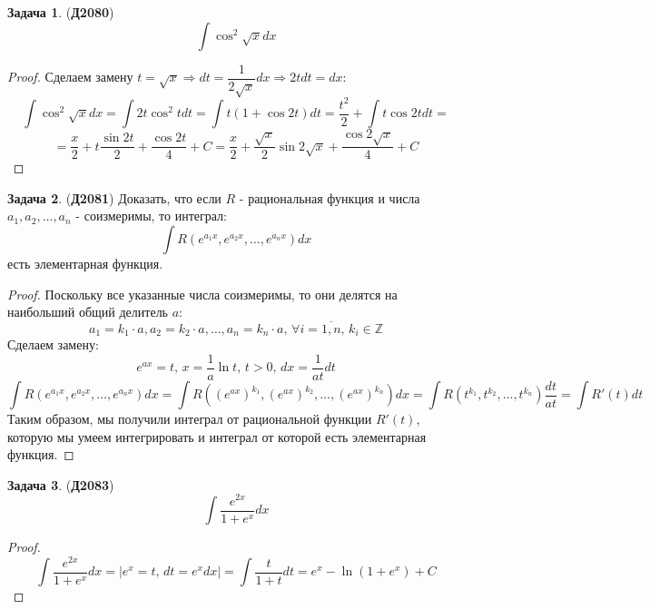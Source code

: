 \documentclass[12pt]{article}
\newcommand{\MZ}{\mathbb{Z}}
\theoremstyle{definition}
\newtheorem{problem}{Задача}
\DeclareMathOperator{\dint}{\displaystyle\int}
\begin{document}
\begin{problem}(\textbf{Д2080})
	$$
		\dint \cos^2{\sqrt{x}}dx
	$$
\end{problem}
\begin{proof}
	Сделаем замену $t = \sqrt{x} \Rightarrow dt = \dfrac{1}{2\sqrt{x}}dx \Rightarrow 2tdt = dx$:
	$$
		\dint \cos^2{\sqrt{x}}dx = \dint 2t \cos^2{t}dt = \dint t(1 + \cos{2t})dt = \dfrac{t^2}{2} + \dint t\cos{2t}dt =
	$$
	$$
		=	\dfrac{x}{2} + t\dfrac{\sin{2t}}{2} + \dfrac{\cos{2t}}{4} + C = \dfrac{x}{2} + \dfrac{\sqrt{x}}{2}\sin{2\sqrt{x}} + \dfrac{\cos{2\sqrt{x}}}{4} + C
	$$
\end{proof}
\newpage
\begin{problem}(\textbf{Д2081})
	Доказать, что если $R$ - рациональная функция и числа $a_1,a_2, \dotsc, a_n$ - соизмеримы, то интеграл:
	$$
		\dint R(e^{a_1 x}, e^{a_2 x}, \dotsc, e^{a_n x})dx
	$$
	есть элементарная функция.
\end{problem}
\begin{proof}
	Поскольку все указанные числа соизмеримы, то они делятся на наибольший общий делитель $a$:
	$$
		a_1 = k_1{\cdot}a, a_2 = k_2{\cdot}a, \dotsc, a_n = k_n{\cdot}a, \, \forall i =\overline{1,n}, \, k_i \in \MZ
	$$
	Сделаем замену:
	$$
		e^{ax} = t, \, x = \dfrac{1}{a}\ln{t}, \, t > 0, \, dx = \dfrac{1}{at}dt
	$$
	$$
		\dint R(e^{a_1 x}, e^{a_2 x}, \dotsc, e^{a_n x})dx = \dint R\left((e^{a x})^{k_1}, (e^{a x})^{k_2}, \dotsc, (e^{a x})^{k_n} \right)dx = \dint R(t^{k_1},t^{k_2},\dotsc, t^{k_n})\dfrac{dt}{at} = \dint R'(t)dt
	$$
	Таким образом, мы получили интеграл от рациональной функции $R'(t)$, которую мы умеем интегрировать и интеграл от которой есть элементарная функция.
\end{proof}

\begin{problem}(\textbf{Д2083})
	$$
		\dint \dfrac{e^{2x}}{1 + e^x}dx
	$$
\end{problem}
\begin{proof}
	$$
		\dint \dfrac{e^{2x}}{1 + e^x}dx = |e^x = t, \, dt = e^xdx| = \dint \dfrac{t}{1 + t}dt = e^x - \ln{(1 + e^x)} + C 
	$$
\end{proof}
\end{document}
